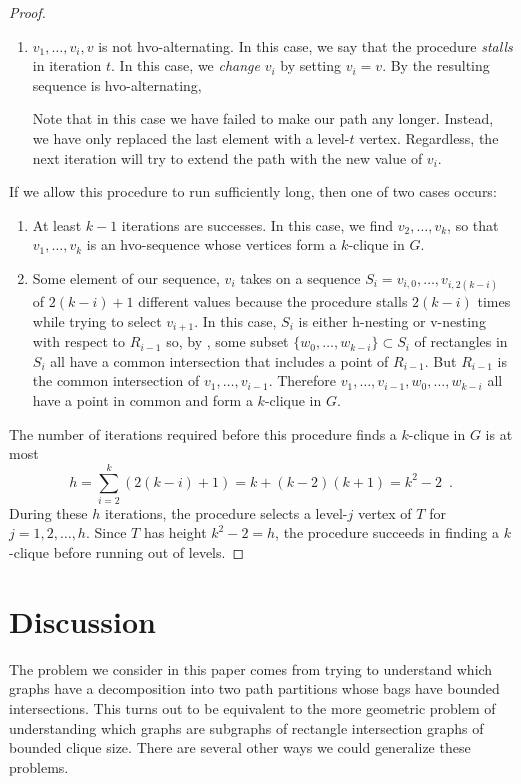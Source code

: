 \documentclass[lotsofwhite]{patmorin}
\begin{document}
\begin{proof}
\begin{enumerate}
     \item $v_1,\ldots,v_i,v$ is not hvo-alternating.  In this case,
       we say that the procedure \emph{stalls} in iteration $t$.
       In this case, we \emph{change} $v_i$ by setting $v_i=v$. By
        the resulting sequence is hvo-alternating,

       Note that in this case we have failed to make our path any
       longer. Instead, we have only replaced the last element with a
       level-$t$ vertex.  Regardless, the next iteration will try to
       extend the path with the new value of $v_i$.
  \end{enumerate}
  If we allow this procedure to run sufficiently long, then one of two
  cases occurs:
  \begin{enumerate}
     \item At least $k-1$ iterations are successes.  In this case, we
     find $v_2,\ldots,v_k$, so that $v_1,\ldots,v_k$ is an hvo-sequence
     whose vertices form a $k$-clique in $G$.

     \item Some element of our sequence, $v_i$ takes on a sequence
     $S_i=v_{i,0},\ldots,v_{i,2(k-i)}$ of $2(k-i)+1$ different values
     because the procedure stalls $2(k-i)$ times while trying to
     select $v_{i+1}$.  In this case, $S_i$ is either h-nesting or
     v-nesting with respect to $R_{i-1}$ so, by , some
     subset $\{w_0,\ldots,w_{k-i}\}\subset S_i$ of rectangles in $S_i$
     all have a common intersection that includes a point of $R_{i-1}$.
     But $R_{i-1}$ is the common intersection of $v_1,\ldots,v_{i-1}$.
     Therefore $v_1,\ldots,v_{i-1},w_{0},\ldots,w_{k-i}$ all have a
     point in common and form a $k$-clique in $G$.
  \end{enumerate}
  The number of iterations required before this procedure finds
  a $k$-clique in $G$ is at most
  \[
      h = \sum_{i=2}^k (2(k-i)+1) = k + (k-2)(k+1) = k^2-2 \enspace .
  \]
  During these $h$ iterations, the procedure selects a level-$j$ vertex
  of $T$ for $j=1,2,\ldots,h$.  Since $T$ has height $k^2-2 = h$, the 
  procedure succeeds in finding a $k$-clique before running out of levels.
\end{proof}

\section{Discussion}

The problem we consider in this paper comes from trying to understand
which graphs have a decomposition into two path partitions whose bags
have bounded intersections.  This turns out to be equivalent to the
more geometric problem of understanding which graphs are subgraphs of
rectangle intersection graphs of bounded clique size.  There are several
other ways we could generalize these problems.
\end{document}
